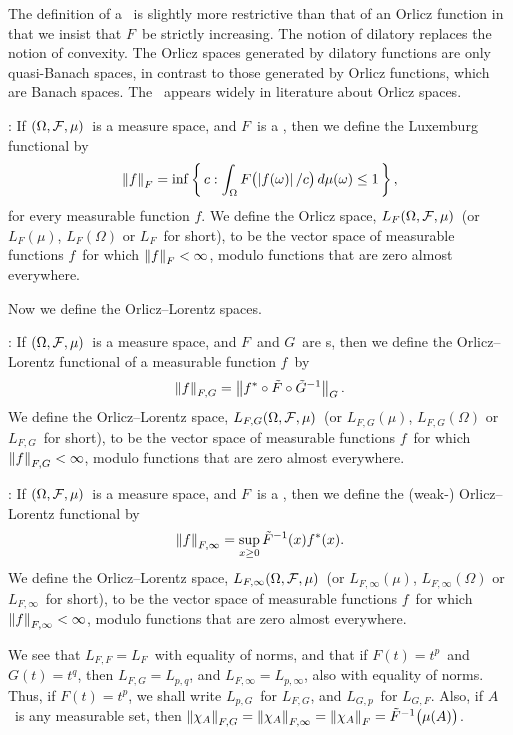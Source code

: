 The definition of a \phifunction\ is slightly more restrictive than that of an
Orlicz function in that we insist that $F$\ be strictly increasing.
The notion of dilatory replaces
the notion of convexity. The Orlicz spaces generated by dilatory
functions are only quasi-Banach spaces, in contrast to those generated by Orlicz
functions, which are Banach spaces. 
The \Deltacond\ appears widely in literature
about Orlicz spaces.

\Definition: If $(\Omega,\F,\mu)$\ is a measure space, and $F$\ is a
\phifunction, then we define the {\dt Luxemburg functional\/} by
$$ \left\| f \right\|_F = \inf\left\{\, c :
   \int_\Omega F\bigl(\left| f(\omega) \right|/c\bigr) \,d\mu(\omega) \le 1 \,\right\} 
   ,$$
for every measurable function $f$. We define the {\dt Orlicz space},
$L_F(\Omega,\F,\mu)$\ (or $L_F(\mu)$, $L_F(\Omega)$ or $L_F$\ for short), to be
the vector space of measurable functions $f$\ for which $\left\| f \right\|_F < \infty$,
modulo functions that are zero almost everywhere.

Now we define the Orlicz--Lorentz spaces.

\Definition: If $(\Omega,\F,\mu)$\ is a measure space, and
$F$\ and $G$\ are \phifunction s, then we define the {\dt
Orlicz--Lorentz functional\/} of a measurable function $f$\ by 
$$ \left\| f \right\|_{F,G} = \left\| f^*\circ\tilde F\circ\tilde G^{-1} \right\|_G .$$
We define the {\dt Orlicz--Lorentz space},
$L_{F,G}(\Omega,\F,\mu)$\ (or $L_{F,G}(\mu)$, $L_{F,G}(\Omega)$ or $L_{F,G}$\ for
short), to be the vector space of measurable functions $f$\ for which $\left\| f \right\|_{F,G} <\infty$, modulo functions that are zero almost everywhere.

\Definition: If $(\Omega,\F,\mu)$\ is a measure space, and
$F$\ is a \phifunction, then we define the ({\dt weak-}){\dt
Orlicz--Lorentz functional\/} by 
$$ \left\| f \right\|_{F,\infty} = \sup_{x\ge0} \tilde F^{-1}(x) f^*(x) .$$
We define the {\dt Orlicz--Lorentz space},
$L_{F,\infty}(\Omega,\F,\mu)$\ (or $L_{F,\infty}(\mu)$, $L_{F,\infty}(\Omega)$ or
$L_{F,\infty}$\ for short), to be the vector space of measurable functions $f$\
for which $\left\| f \right\|_{F,\infty} <\infty$, modulo functions that are zero almost
everywhere.

We see that $L_{F,F} = L_F$\ with equality of norms, and that if $F(t) =
t^p$\ and $G(t) = t^q$, then $L_{F,G} = L_{p,q}$, and $L_{F,\infty} =
L_{p,\infty}$, also with equality of norms. Thus, if $F(t) = t^p$, we shall
write $L_{p,G}$\ for $L_{F,G}$, and $L_{G,p}$\ for $L_{G,F}$.
Also, if $A$\ is any measurable set, then $\left\| \chi_A \right\|_{F,G} =
\left\| \chi_A \right\|_{F,\infty} = \left\| \chi_A \right\|_F = \tilde F^{-1}\bigl(\mu(A)\bigr)$.

